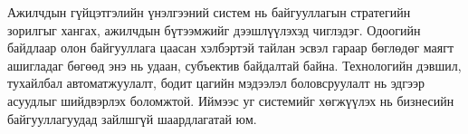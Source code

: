 Ажилчдын гүйцэтгэлийн үнэлгээний систем нь байгууллагын стратегийн зорилгыг хангах, ажилчдын бүтээмжийг дээшлүүлэхэд чиглэдэг. Одоогийн байдлаар олон байгууллага цаасан хэлбэртэй тайлан эсвэл гараар бөглөдөг маягт ашигладаг бөгөөд энэ нь удаан, субъектив байдалтай байна. Технологийн дэвшил, тухайлбал автоматжуулалт, бодит цагийн мэдээлэл боловсруулалт нь эдгээр асуудлыг шийдвэрлэх боломжтой. Иймээс уг системийг хөгжүүлэх нь бизнесийн байгууллагуудад зайлшгүй шаардлагатай юм.
